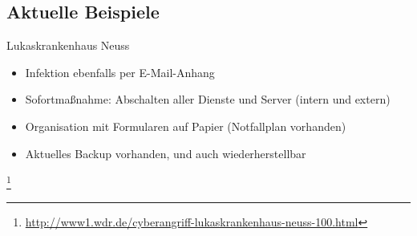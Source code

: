 \documentclass[10pt]{beamer}
\begin{document}
\subsection{Aktuelle Beispiele}


\begin{frame}{Lukaskrankenhaus Neuss}

	\begin{itemize}
		\item Infektion ebenfalls per E-Mail-Anhang
		\item Sofortmaßnahme: Abschalten aller Dienste und Server (intern und extern) \pause
		\item Organisation mit Formularen auf Papier (Notfallplan vorhanden)
		\item Aktuelles Backup vorhanden\pause , und auch wiederherstellbar
	\end{itemize}
	\let\thefootnote\relax\footnote{\url{http://www1.wdr.de/cyberangriff-lukaskrankenhaus-neuss-100.html}}
\end{frame}
\end{document}
